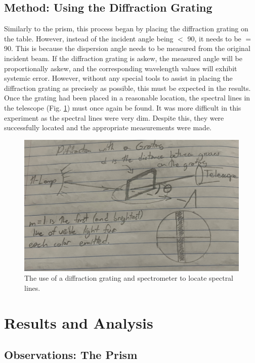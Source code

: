 \documentclass[letterpaper,11pt] {article}
\begin{document}
\subsection{Method: Using the Diffraction Grating}

Similarly to the prism, this process began by placing the diffraction grating on the table. However, instead of the incident angle being $<$ 90\textdegree\text{}, it needs to be $=$ 90\textdegree\text{}. This is because the dispersion angle needs to be measured from the original incident beam. If the diffraction grating is askew, the measured angle will be proportionally askew, and the corresponding wavelength values will exhibit systemic error. However, without any special tools to assist in placing the diffraction grating as precisely as possible, this must be expected in the results. Once the grating had been placed in a reasonable location, the spectral lines in the telescope (Fig. \ref{fig4}) must once again be found. It was more difficult in this experiment as the spectral lines were very dim. Despite this, they were successfully located and the appropriate measurements were made. 

\begin{figure}[H] 
        \centering \includegraphics[width=0.8\columnwidth]{H-Spectrum Lab photos/Diffraction Grating Drawing.jpg}
        \caption{\label{fig4}The use of a diffraction grating and spectrometer to locate spectral lines.
        }
\end{figure}

\section{Results and Analysis}

\subsection{Observations: The Prism}
\end{document}
